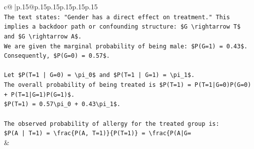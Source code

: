 \documentclass{article}
\begin{document}
{\begin{supertabular}{c@{$\;$}|p{.15\linewidth}@{}p{.15\linewidth}p{.15\linewidth}p{.15\linewidth}p{.15\linewidth}p{.15\linewidth}}
{{{\\ 
\texttt{The text states: "Gender has a direct effect on treatment." This implies a backdoor path or confounding structure: \$G \textbackslash{}rightarrow T\$ and \$G \textbackslash{}rightarrow A\$.} \\
\texttt{We are given the marginal probability of being male: \$P(G=1) = 0.43\$. Consequently, \$P(G=0) = 0.57\$.} \\
\\ 
\texttt{Let \$P(T=1 | G=0) = \textbackslash{}pi\_0\$ and \$P(T=1 | G=1) = \textbackslash{}pi\_1\$.} \\
\texttt{The overall probability of being treated is \$P(T=1) = P(T=1|G=0)P(G=0) + P(T=1|G=1)P(G=1)\$.} \\
\texttt{\$P(T=1) = 0.57\textbackslash{}pi\_0 + 0.43\textbackslash{}pi\_1\$.} \\
\\ 
\texttt{The observed probability of allergy for the treated group is:} \\
\texttt{\$P(A | T=1) = \textbackslash{}frac\{P(A, T=1)\}\{P(T=1)\} = \textbackslash{}frac\{P(A|G=} \\
            }
        }
    }
    & \\ \\


\end{supertabular}}
\end{document}
